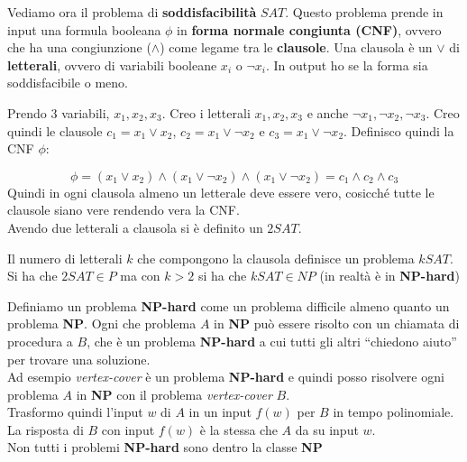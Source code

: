 			\begin{definizione}
				Vediamo ora il problema di \textbf{soddisfacibilità} $SAT$. Questo problema
				prende in input una formula booleana $\phi$ in \textbf{forma normale congiunta
					(CNF)}, ovvero che ha una congiunzione ($\land$) come legame tra le
				\textbf{clausole}. Una clausola è un $\lor$ di \textbf{letterali}, ovvero di
				variabili booleane $x_i$ o $\neg x_i$. In output ho se la forma sia
				soddisfacibile o meno. 
				\begin{esempio}
					Prendo 3 variabili, $x_1,x_2,x_3$. Creo i letterali  $x_1,x_2,x_3$ e anche
					$\neg x_1,\neg x_2,\neg x_3$. Creo quindi le clausole $c_1=x_1\lor x_2$,
					$c_2=x_1\lor \neg x_2$ e $c_3=x_1\lor \neg x_2$. Definisco quindi la CNF
					$\phi$:
										    
					\[\phi=(x_1\lor x_2)\land (x_1\lor \neg x_2)\land
						(x_1\lor \neg x_2)=c_1\land c_2\land c_3\]
						Quindi in ogni clausola almeno un letterale deve essere vero, cosicché tutte
						le clausole siano vere rendendo vera la CNF.\\
						Avendo due letterali a clausola si è definito un $2SAT$.
						\end{esempio}
						Il numero di letterali $k$ che compongono la clausola definisce un problema
						$kSAT$. Si ha che $2SAT\in P$ ma con $k>2$ si ha che $kSAT\in NP$ (in
						realtà è in \textbf{NP-hard})
						\end{definizione}
						\begin{definizione}
							Definiamo un problema \textbf{NP-hard} come un problema difficile almeno
							quanto un problema \textbf{NP}. Ogni che problema $A$ in \textbf{NP} può
							essere risolto con un chiamata di procedura a $B$, che è un problema
							\textbf{NP-hard} a cui tutti gli altri ``chiedono aiuto'' per trovare una
							soluzione. \\
							Ad esempio \textit{vertex-cover} è un problema \textbf{NP-hard} e quindi posso
							risolvere ogni problema $A$ in \textbf{NP} con il problema
							\textit{vertex-cover} $B$.\\
							Trasformo quindi l'input $w$ di $A$ in un input
							$f(w)$ per $B$ in tempo polinomiale. La risposta di $B$ con input $f(w)$ è la
							stessa che $A$ da su input $w$.\\
							Non tutti i problemi \textbf{NP-hard} sono dentro la classe \textbf{NP}
						\end{definizione}
